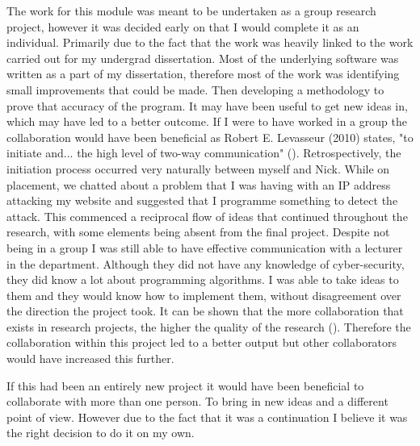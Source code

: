 The work for this module was meant to be undertaken as a group research project, however it was decided early on that I would complete it as an individual. Primarily due to the fact that the work was heavily linked to the work carried out for my undergrad dissertation. Most of the underlying software was written as a part of my dissertation, therefore most of the work was identifying small improvements that could be made. Then developing a methodology to prove that accuracy of the program. It may have been useful to get new ideas in, which may have led to a better outcome. If I were to have worked in a group the collaboration would have been beneficial as Robert E. Levasseur (2010) states, "to initiate and... the high level of two-way communication" (\cite{levasseur2010people}). Retrospectively, the initiation process occurred very naturally between myself and Nick. While on placement, we chatted about a problem that I was having with an IP address attacking my website and suggested that I programme something to detect the attack. This commenced a reciprocal flow of ideas that continued throughout the research, with some elements being absent from the final project. Despite not being in a group I was still able to have effective communication with a lecturer in the department. Although they did not have any knowledge of cyber-security, they did know a lot about programming algorithms. I was able to take ideas to them and they would know how to implement them, without disagreement over the direction the project took. It can be shown that the more collaboration that exists in research projects, the higher the quality of the research (\cite{figg2006scientific}). Therefore the collaboration within this project led to a better output but other collaborators would have increased this further. 




If this had been an entirely new project it would have been beneficial to collaborate with more than one person. To bring in new ideas and a different point of view. However due to the fact that it was a continuation I believe it was the right decision to do it on my own.  